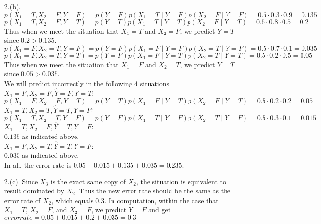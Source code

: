 \documentclass[12pt]{article}
\begin{document}
\begin{itemize}



\item[2.(b).] \smallskip $p(X_1 = T, X_2 = F, Y = F) =  p(Y = F)p(X_1 = T \mid Y = F)p(X_2 = F \mid Y = F) = 0.5\cdot0.3\cdot0.9 = 0.135$\\ $p(X_1 = T, X_2 = F, Y = T) =  p(Y = T)p(X_1 = T \mid Y = T)p(X_2 = F \mid Y = T) = 0.5\cdot0.8\cdot0.5 = 0.2$ \\Thus when we meet the situation that $X_1 = T$ and $X_2 = F$, we predict $Y = T$ since $0.2 > 0.135$.\\

$p(X_1 = F, X_2 = T, Y = F) =  p(Y = F)p(X_1 = F \mid Y = F)p(X_2 = T \mid Y = F) = 0.5\cdot0.7\cdot0.1 = 0.035$\\ $p(X_1 = F, X_2 = T, Y = T) =  p(Y = F)p(X_1 = F \mid Y = T)p(X_2 = T \mid Y = T) = 0.5\cdot0.2\cdot0.5 = 0.05$\\
Thus when we meet the situation that $X_1 = F$ and $X_2 = T$, we predict $Y = T$ since $0.05 > 0.035$. \\

We will predict incorrectly in the following 4 situations:\\
$X_1 = F, X_2 = F, \hat Y = F, Y = T$:\\
$p(X_1 = F, X_2 = F, Y = T) =  p(Y = T)p(X_1 = F \mid Y = T)p(X_2 = F \mid Y = T) = 0.5\cdot0.2\cdot0.2 = 0.05$\\
$X_1 = T, X_2 = T, \hat Y = T, Y = F$:\\
$p(X_1 = T, X_2 = T, Y = F) =  p(Y = F)p(X_1 = T \mid Y = F)p(X_2 = T \mid Y = F) = 0.5\cdot0.3\cdot0.1 = 0.015$\\
$X_1 = T, X_2 = F, \hat Y = T, Y = F$:\\
$0.135$ as indicated above. \\
$X_1 = F, X_2 = T, \hat Y = T, Y = F$:\\
$0.035$ as indicated above. \\

In all, the error rate is $0.05+0.015+0.135+0.035 = 0.235$.

\end{itemize}

\begin{itemize}



\item[2.(c).] \smallskip Since $X_3$ is the exact same copy of $X_2$, the situation is equivalent to result  dominated by $X_2$. Thus the new error rate should be the same as the error rate of $X_2$, which equals 0.3. 
In computation, within the case that $X_1 = T$, $X_2 = F$, and $X_3 = F$, we predict $Y = F$ and get
$error rate = 0.05+0.015+0.2+0.035 = 0.3$\\

\end{itemize}
\end{document}
